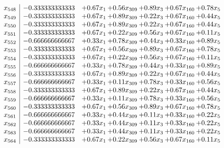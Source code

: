 \documentclass[8pt]{article}
\begin{document}
\[\begin{array}{c| c c@{\hskip 2pt} c@{\hskip 2pt} c@{\hskip 2pt} c@{\hskip 2pt} c@{\hskip 2pt} }
 x_{548}   &  -0.333333333333 & +  0.67 x_{1} & +  0.56 x_{309} & +  0.89 x_{3} & +  0.67 x_{160} & +  0.78 x_{5}\\
 x_{549}   &  -0.333333333333 & +  0.67 x_{1} & +  0.89 x_{309} & +  0.22 x_{3} & +  0.67 x_{160} & +  0.44 x_{5}\\
 x_{550}   &  -0.333333333333 & +  0.67 x_{1} & +  0.89 x_{309} & +  0.22 x_{3} & +  0.67 x_{160} & +  0.44 x_{5}\\
 x_{551}   &  -0.333333333333 & +  0.67 x_{1} & +  0.22 x_{309} & +  0.56 x_{3} & +  0.67 x_{160} & +  0.11 x_{5}\\
 x_{552}   &  -0.666666666667 & +  0.33 x_{1} & +  0.78 x_{309} & +  0.44 x_{3} & +  0.33 x_{160} & +  0.89 x_{5}\\
 x_{553}   &  -0.333333333333 & +  0.67 x_{1} & +  0.56 x_{309} & +  0.89 x_{3} & +  0.67 x_{160} & +  0.78 x_{5}\\
 x_{554}   &  -0.333333333333 & +  0.67 x_{1} & +  0.22 x_{309} & +  0.56 x_{3} & +  0.67 x_{160} & +  0.11 x_{5}\\
 x_{555}   &  -0.666666666667 & +  0.33 x_{1} & +  0.78 x_{309} & +  0.44 x_{3} & +  0.33 x_{160} & +  0.89 x_{5}\\
 x_{556}   &  -0.333333333333 & +  0.67 x_{1} & +  0.89 x_{309} & +  0.22 x_{3} & +  0.67 x_{160} & +  0.44 x_{5}\\
 x_{557}   &  -0.666666666667 & +  0.33 x_{1} & +  0.11 x_{309} & +  0.78 x_{3} & +  0.33 x_{160} & +  0.56 x_{5}\\
 x_{558}   &  -0.333333333333 & +  0.67 x_{1} & +  0.89 x_{309} & +  0.22 x_{3} & +  0.67 x_{160} & +  0.44 x_{5}\\
 x_{559}   &  -0.666666666667 & +  0.33 x_{1} & +  0.11 x_{309} & +  0.78 x_{3} & +  0.33 x_{160} & +  0.56 x_{5}\\
 x_{560}   &  -0.333333333333 & +  0.67 x_{1} & +  0.56 x_{309} & +  0.89 x_{3} & +  0.67 x_{160} & +  0.78 x_{5}\\
 x_{561}   &  -0.666666666667 & +  0.33 x_{1} & +  0.44 x_{309} & +  0.11 x_{3} & +  0.33 x_{160} & +  0.22 x_{5}\\
 x_{562}   &  -0.666666666667 & +  0.33 x_{1} & +  0.44 x_{309} & +  0.11 x_{3} & +  0.33 x_{160} & +  0.22 x_{5}\\
 x_{563}   &  -0.666666666667 & +  0.33 x_{1} & +  0.44 x_{309} & +  0.11 x_{3} & +  0.33 x_{160} & +  0.22 x_{5}\\
 x_{564}   &  -0.333333333333 & +  0.67 x_{1} & +  0.22 x_{309} & +  0.56 x_{3} & +  0.67 x_{160} & +  0.11 x_{5}\\

\end{array}\]
\end{document}
